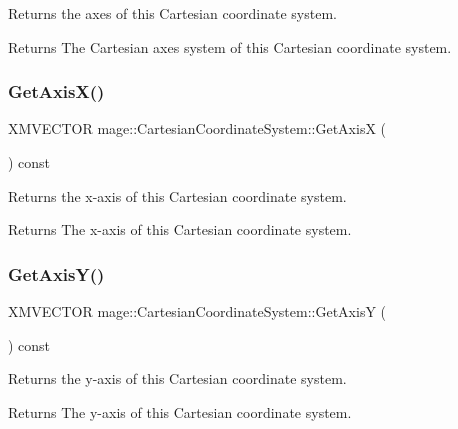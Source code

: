 Returns the axes of this Cartesian coordinate system.

\begin{DoxyReturn}{Returns}
The Cartesian axes system of this Cartesian coordinate system. 
\end{DoxyReturn}
\hypertarget{structmage_1_1_cartesian_coordinate_system_ad79c4e6ae091d2a0268f1b9c1f06b7b2}{}\label{structmage_1_1_cartesian_coordinate_system_ad79c4e6ae091d2a0268f1b9c1f06b7b2} 
\subsubsection{\texorpdfstring{Get\+Axis\+X()}{GetAxisX()}}
{\footnotesize\ttfamily X\+M\+V\+E\+C\+T\+OR mage\+::\+Cartesian\+Coordinate\+System\+::\+Get\+AxisX (\begin{DoxyParamCaption}{ }\end{DoxyParamCaption}) const}

Returns the x-\/axis of this Cartesian coordinate system.

\begin{DoxyReturn}{Returns}
The x-\/axis of this Cartesian coordinate system. 
\end{DoxyReturn}
\hypertarget{structmage_1_1_cartesian_coordinate_system_a793c9783db21865ccf55f153cca963f3}{}\label{structmage_1_1_cartesian_coordinate_system_a793c9783db21865ccf55f153cca963f3} 
\subsubsection{\texorpdfstring{Get\+Axis\+Y()}{GetAxisY()}}
{\footnotesize\ttfamily X\+M\+V\+E\+C\+T\+OR mage\+::\+Cartesian\+Coordinate\+System\+::\+Get\+AxisY (\begin{DoxyParamCaption}{ }\end{DoxyParamCaption}) const}

Returns the y-\/axis of this Cartesian coordinate system.

\begin{DoxyReturn}{Returns}
The y-\/axis of this Cartesian coordinate system. 
\end{DoxyReturn}
\hypertarget{structmage_1_1_cartesian_coordinate_system_ac152628841e8a51092b785bf62a64d98}{}\label{structmage_1_1_cartesian_coordinate_system_ac152628841e8a51092b785bf62a64d98} 
